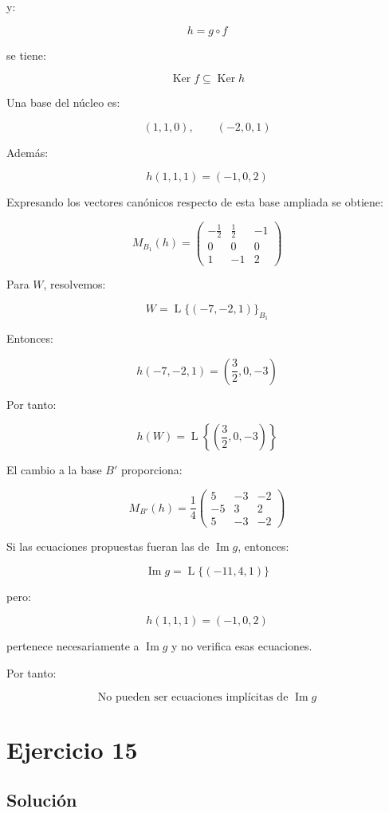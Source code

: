\documentclass[11pt,a4paper]{article}
\newcommand{\Ker}{\operatorname{Ker}}
\newcommand{\Ima}{\operatorname{Im}}
\newcommand{\Span}{\operatorname{L}}
\begin{document}
	y:

	\[
	h=g\circ f
	\]

	se tiene:

	\[
	\Ker f\subseteq\Ker h
	\]

	Una base del núcleo es:

	\[
	(1,1,0),
	\qquad
	(-2,0,1)
	\]

	Además:

	\[
	h(1,1,1)=(-1,0,2)
	\]

	Expresando los vectores canónicos respecto de esta base ampliada se obtiene:

	\[
	\boxed{
	M_{B_1}(h)
	=
	\begin{pmatrix}
	-\frac12&\frac12&-1\\
	0&0&0\\
	1&-1&2
	\end{pmatrix}
	}
	\]

	Para $W$, resolvemos:

	\[
	W=
	\Span\{(-7,-2,1)\}_{B_1}
	\]

	Entonces:

	\[
	h(-7,-2,1)
	=
	\left(
	\frac32,0,-3
	\right)
	\]

	Por tanto:

	\[
	\boxed{
	h(W)
	=
	\Span
	\left\{
	\left(\frac32,0,-3\right)
	\right\}
	}
	\]

	El cambio a la base $B'$ proporciona:

	\[
	\boxed{
	M_{B'}(h)
	=
	\frac14
	\begin{pmatrix}
	5&-3&-2\\
	-5&3&2\\
	5&-3&-2
	\end{pmatrix}
	}
	\]

	Si las ecuaciones propuestas fueran las de $\Ima g$, entonces:

	\[
	\Ima g
	=
	\Span\{(-11,4,1)\}
	\]

	pero:

	\[
	h(1,1,1)=(-1,0,2)
	\]

	pertenece necesariamente a $\Ima g$ y no verifica esas ecuaciones.

	Por tanto:

	\[
	\boxed{
	\text{No pueden ser ecuaciones implícitas de }\Ima g
	}
	\]

\section{Ejercicio 15}
	\subsection{Solución}
\end{document}
